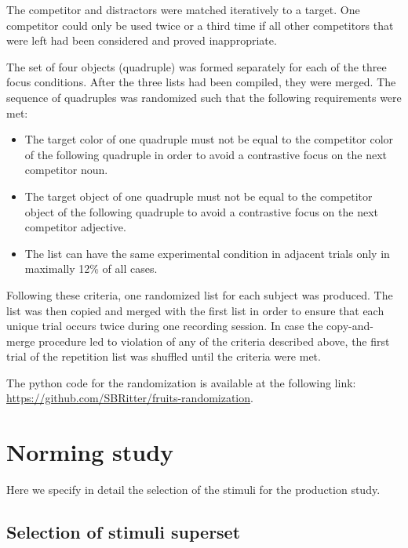 \documentclass[
]{article}
\providecommand{\tightlist}{%
  \setlength{\itemsep}{0pt}\setlength{\parskip}{0pt}}
\begin{document}
The competitor and distractors were matched iteratively to a target.
One competitor could only be used twice or a third time if all other competitors that were left had been considered and proved inappropriate.

The set of four objects (quadruple) was formed separately for each of the three focus conditions.
After the three lists had been compiled, they were merged.
The sequence of quadruples was randomized such that the following requirements were met:

\begin{itemize}
\tightlist
\item
  The target color of one quadruple must not be equal to the competitor color of the following quadruple in order to avoid a contrastive focus on the next competitor noun.
\item
  The target object of one quadruple must not be equal to the competitor object of the following quadruple to avoid a contrastive focus on the next competitor adjective.
\item
  The list can have the same experimental condition in adjacent trials only in maximally 12\% of all cases.
\end{itemize}

Following these criteria, one randomized list for each subject was produced.
The list was then copied and merged with the first list in order to ensure that each unique trial occurs twice during one recording session.
In case the copy-and-merge procedure led to violation of any of the criteria described above, the first trial of the repetition list was shuffled until the criteria were met.

The python code for the randomization is available at the following link: \url{https://github.com/SBRitter/fruits-randomization}.

\hypertarget{norming}{%
\section{Norming study}\label{norming}}

Here we specify in detail the selection of the stimuli for the production study.

\hypertarget{selection-of-stimuli-superset}{%
\subsection{Selection of stimuli superset}\label{selection-of-stimuli-superset}}
\end{document}
